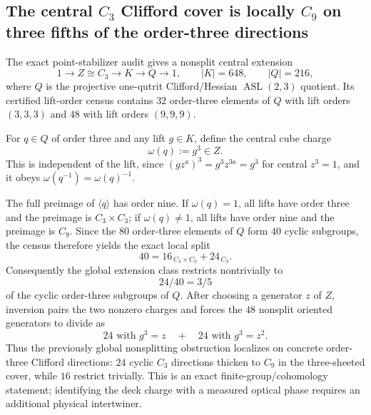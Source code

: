 \subsection{The central $C_3$ Clifford cover is locally $C_9$ on three fifths of the order-three directions}

The exact point-stabilizer audit gives a nonsplit central extension
\[
1\longrightarrow Z\cong C_3\longrightarrow K\longrightarrow Q\longrightarrow 1,
\qquad |K|=648,\qquad |Q|=216,
\]
where $Q$ is the projective one-qutrit Clifford/Hessian $\operatorname{ASL}(2,3)$ quotient.  Its certified lift-order census contains $32$ order-three elements of $Q$ with lift orders $(3,3,3)$ and $48$ with lift orders $(9,9,9)$.

For $q\in Q$ of order three and any lift $g\in K$, define the central cube charge
\[
\omega(q):=g^3\in Z.
\]
This is independent of the lift, since $(gz^a)^3=g^3z^{3a}=g^3$ for central $z^3=1$, and it obeys $\omega(q^{-1})=\omega(q)^{-1}$.

The full preimage of $\langle q\rangle$ has order nine.  If $\omega(q)=1$, all lifts have order three and the preimage is $C_3\times C_3$; if $\omega(q)\neq1$, all lifts have order nine and the preimage is $C_9$.  Since the $80$ order-three elements of $Q$ form $40$ cyclic subgroups, the census therefore yields the exact local split
\[
\boxed{40=16_{\,C_3\times C_3}+24_{\,C_9}}.
\]
Consequently the global extension class restricts nontrivially to
\[
\boxed{24/40=3/5}
\]
of the cyclic order-three subgroups of $Q$.  After choosing a generator $z$ of $Z$, inversion pairs the two nonzero charges and forces the $48$ nonsplit oriented generators to divide as
\[
\boxed{24\text{ with }g^3=z\quad+\quad24\text{ with }g^3=z^2}.
\]
Thus the previously global nonsplitting obstruction localizes on concrete order-three Clifford directions: $24$ cyclic $C_3$ directions thicken to $C_9$ in the three-sheeted cover, while $16$ restrict trivially.  This is an exact finite-group/cohomology statement; identifying the deck charge with a measured optical phase requires an additional physical intertwiner.
